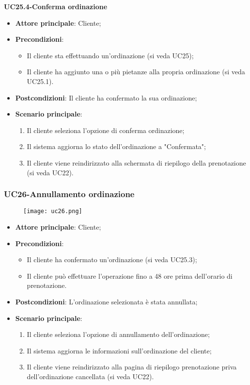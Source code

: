 \textbf{UC25.4-Conferma ordinazione}

\begin{itemize}
\item \textbf{Attore principale}: Cliente;
\item \textbf{Precondizioni}:
\begin{itemize}
\item Il cliente sta effettuando un'ordinazione (si veda UC25);
\item Il cliente ha aggiunto una o più pietanze alla propria ordinazione (si veda UC25.1).
\end{itemize}
\item \textbf{Postcondizioni}: Il cliente ha confermato la sua ordinazione;
\item \textbf{Scenario principale}:
\begin{enumerate}
\item Il cliente seleziona l'opzione di conferma ordinazione;
\item Il sistema aggiorna lo stato dell'ordinazione a "Confermata";
\item Il cliente viene reindirizzato alla schermata di riepilogo della prenotazione (si veda UC22).
\end{enumerate}
\end{itemize}

\pagebreak
\subsubsection{UC26-Annullamento ordinazione}
\begin{figure}[h] \texttt{[image: uc26.png]} \end{figure}

\begin{itemize}
\item \textbf{Attore principale}: Cliente;
\item \textbf{Precondizioni}:
\begin{itemize}
\item Il cliente ha confermato un'ordinazione (si veda UC25.3);
\item Il cliente può effettuare l'operazione fino a 48 ore prima dell'orario di prenotazione.
\end{itemize}
\item \textbf{Postcondizioni}: L'ordinazione selezionata è stata annullata;
\item \textbf{Scenario principale}:
\begin{enumerate}
\item Il cliente seleziona l'opzione di annullamento dell'ordinazione;
\item Il sistema aggiorna le informazioni sull'ordinazione del cliente;
\item Il cliente viene reindirizzato alla pagina di riepilogo prenotazione priva dell'ordinazione cancellata (si veda UC22).
\end{enumerate}
\end{itemize}
